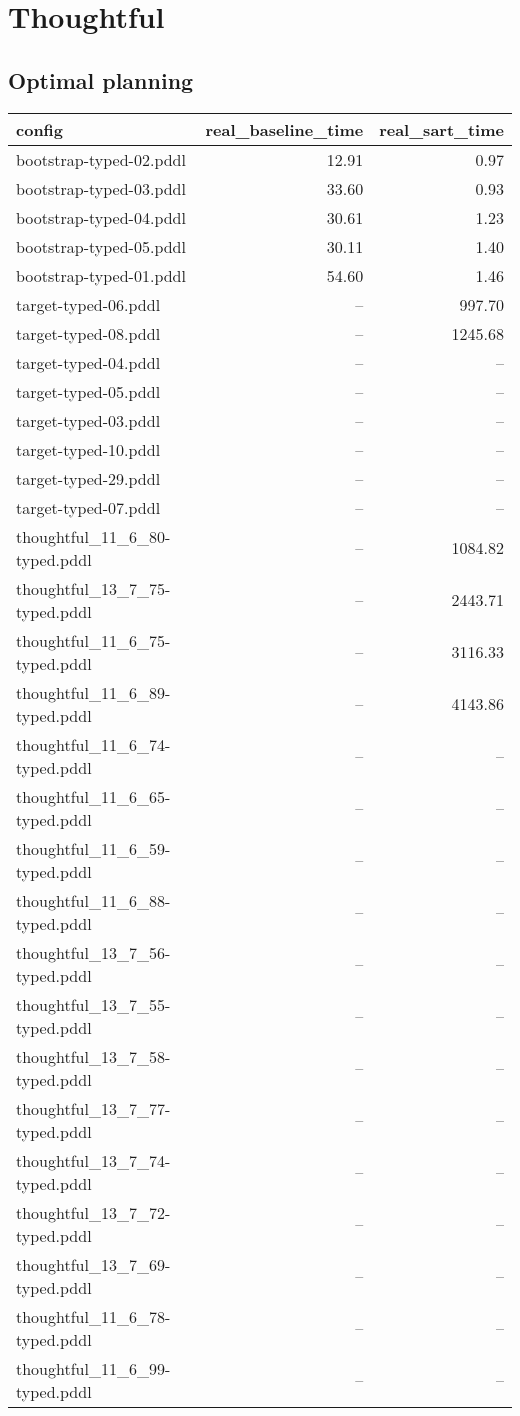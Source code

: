 \documentclass{article}
\begin{document}
                \newpage \section{Thoughtful}
                    \subsection*{Optimal planning}
                    
                            \begin{center}
                            \scriptsize
                            \begin{tabular}{@{}l|r|r@{}}
                            config & real\_baseline\_time & real\_sart\_time\\\midrule
                             bootstrap-typed-02.pddl&12.91&0.97\\
 bootstrap-typed-03.pddl&33.60&0.93\\
 bootstrap-typed-04.pddl&30.61&1.23\\
 bootstrap-typed-05.pddl&30.11&1.40\\
 bootstrap-typed-01.pddl&54.60&1.46\\
 target-typed-06.pddl&--&997.70\\
 target-typed-08.pddl&--&1245.68\\
 target-typed-04.pddl&--&--\\
 target-typed-05.pddl&--&--\\
 target-typed-03.pddl&--&--\\
 target-typed-10.pddl&--&--\\
 target-typed-29.pddl&--&--\\
 target-typed-07.pddl&--&--\\
 thoughtful\_11\_6\_80-typed.pddl&--&1084.82\\
 thoughtful\_13\_7\_75-typed.pddl&--&2443.71\\
 thoughtful\_11\_6\_75-typed.pddl&--&3116.33\\
 thoughtful\_11\_6\_89-typed.pddl&--&4143.86\\
 thoughtful\_11\_6\_74-typed.pddl&--&--\\
 thoughtful\_11\_6\_65-typed.pddl&--&--\\
 thoughtful\_11\_6\_59-typed.pddl&--&--\\
 thoughtful\_11\_6\_88-typed.pddl&--&--\\
 thoughtful\_13\_7\_56-typed.pddl&--&--\\
 thoughtful\_13\_7\_55-typed.pddl&--&--\\
 thoughtful\_13\_7\_58-typed.pddl&--&--\\
 thoughtful\_13\_7\_77-typed.pddl&--&--\\
 thoughtful\_13\_7\_74-typed.pddl&--&--\\
 thoughtful\_13\_7\_72-typed.pddl&--&--\\
 thoughtful\_13\_7\_69-typed.pddl&--&--\\
 thoughtful\_11\_6\_78-typed.pddl&--&--\\
 thoughtful\_11\_6\_99-typed.pddl&--&--
                            \end{tabular}
                            \end{center}
\end{document}
